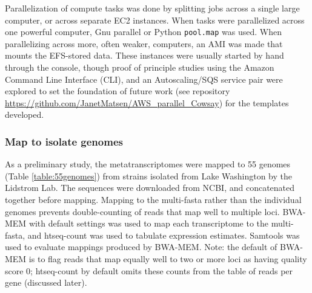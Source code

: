 Parallelization of compute tasks was done by splitting jobs across a single large computer, or across separate EC2 instances.
When tasks were parallelized across one powerful computer, Gnu parallel or Python \texttt{pool.map} was used.
When parallelizing across more, often weaker, computers, an AMI was made that mounts the EFS-stored data.
These instances were usually started by hand through the console, though proof of principle studies using the Amazon Command Line Interface (CLI),
    and an Autoscaling/SQS service pair were explored to set the foundation of future work (see repository \url{https://github.com/JanetMatsen/AWS_parallel_Cowsay}) for the templates developed.

\subsubsection{Map to isolate genomes}  %
As a preliminary study, the metatranscriptomes were mapped to 55 genomes (Table \ref{table:55genomes}) from strains isolated from Lake Washington by the Lidstrom Lab.
The sequences were downloaded from NCBI, and concatenated together before mapping.
Mapping to the multi-fasta rather than the individual genomes prevents double-counting of reads that map well to multiple loci.
BWA-MEM \cite{li2009} with default settings was used to map each transcriptome to the multi-fasta, and htseq-count \cite{anders2014} was used to tabulate expression estimates.
Samtools \cite{li2009samtools} was used to evaluate mappings produced by BWA-MEM.
Note: the default of BWA-MEM is to flag reads that map equally well to two or more loci as having quality score 0; htseq-count by default omits these counts from the table of reads per gene (discussed later).

